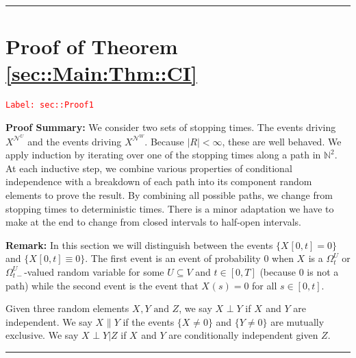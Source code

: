 \documentclass[12pt]{article}
\newcommand{\skipLine}{\vspace{12pt}}
\newcommand{\mb}{\mathbb}
\newcommand{\mc}{\mathcal}
\newcommand{\te}{\text}
\newcommand{\tr}{\textcolor{red}}
\newcommand{\labe}[1]{\tr{\texttt{Label: #1}}}
\newcommand{\pfsum}{\textbf{Proof Summary: }}
\newcommand{\ind}{\hspace{24pt}}
\newcommand{\lin}{\rule{\linewidth}{0.4 pt}}
\renewcommand{\U}{U}							%
\newcommand{\UU}{W}								%
\newcommand{\UUU}{R}							%
\newcommand{\T}{T}								%
\renewcommand{\t}{t}							%
\newcommand{\sset}{\Omega}						%
\renewcommand{\tt}{s}							%
\newcommand{\X}{X}								%
\newcommand{\neigh}{\mc{N}}						%
\newcommand{\vind}[1]{^{#1}}					%
\newcommand{\vsi}[1]{^{#1}}						%
\newcommand{\cind}[1]{_{#1}}					%
\newcommand{\tp}[1]{(#1)}						%
\newcommand{\tip}[1]{#1}						%
\newcommand{\ts}[1]{_{#1}}						%
\newcommand{\XX}{Y}								%
\newcommand{\XXX}{Z}							%
\newcommand{\mutex}{\|}							%
\begin{document}
\lin

\section{Proof of Theorem \ref{sec::Main:Thm::CI}}
\label{sec::Proof1}\labe{sec::Proof1}

\pfsum We consider two sets of stopping times. The events driving \(\X\cind{}\tip{}^{\neigh\vind{\U}}\) and the events driving \(\X\cind{}\tip{}^{\neigh\vind{\UU}}\). Because \(|\UUU| < \infty\), these are well behaved. We apply induction by iterating over one of the stopping times along a path in \(\mb{N}^2\). At each inductive step, we combine various properties of conditional independence with a breakdown of each path into its component random elements to prove the result. By combining all possible paths, we change from stopping times to deterministic times. There is a minor adaptation we have to make at the end to change from closed intervals to half-open intervals.

\skipLine

\textbf{Remark:} In this section we will distinguish between the events \(\{\X\cind{}\tip{[0,\t]} = 0\}\) and \(\{\X\cind{}\tip{[0,\t]}\equiv 0\}\). The first event is an event of probability 0 when \(\X\cind{}\tip{}\) is a \(\sset\vsi{\U}\ts{\t}\) or \(\sset\vsi{\U}\ts{\t-}\)-valued random variable for some \(\U\subseteq V\) and \(\t \in [0,\T]\) (because 0 is not a path) while the second event is the event that \(\X\cind{}\tp{\tt} = 0\) for all \(\tt \in [0,\t]\).

\ind Given three random elements \(\X\cind{}\tip{},\XX{}{} \te{ and } \XXX{}{}\), we say \(\X\cind{}\tip{}\perp \XX{}{}\) if \(\X\cind{}\tip{}\) and \(\XX{}{}\) are independent. We say \(\X\cind{}\tip{}\mutex \XX{}{}\) if the events \(\{\X\cind{}\tip{}\neq 0\}\) and \(\{\XX{}{} \neq 0\}\) are mutually exclusive. We say \(\X\cind{}\tip{}\perp \XX{}{}|\XXX{}{}\) if \(\X\cind{}\tip{}\) and \(\XX{}{}\) are conditionally independent given \(\XXX{}{}\).

\lin
\end{document}
